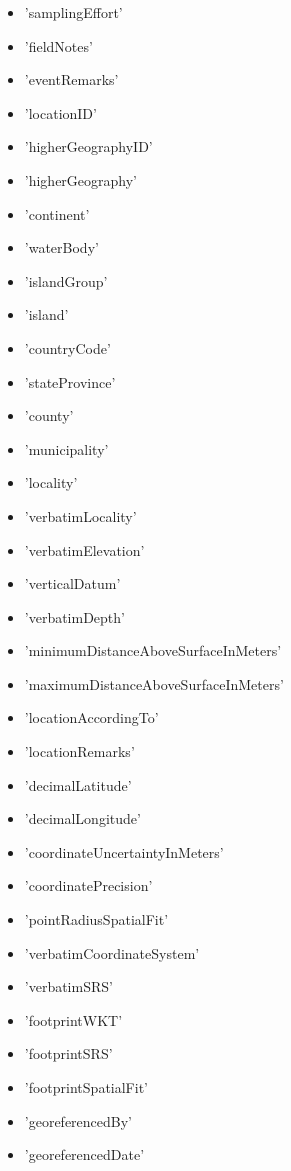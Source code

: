 \documentclass[a4paper]{book}
\begin{document}
\begin{Details}
\begin{itemize}
\item{} 'samplingEffort'
\item{} 'fieldNotes' 
\item{} 'eventRemarks' 
\item{} 'locationID'   
\item{} 'higherGeographyID'
\item{} 'higherGeography' 
\item{} 'continent'
\item{} 'waterBody'
\item{} 'islandGroup' 
\item{} 'island' 
\item{} 'countryCode' 
\item{} 'stateProvince' 
\item{} 'county' 
\item{} 'municipality' 
\item{} 'locality' 
\item{} 'verbatimLocality' 
\item{} 'verbatimElevation'
\item{} 'verticalDatum'
\item{} 'verbatimDepth'
\item{} 'minimumDistanceAboveSurfaceInMeters'
\item{} 'maximumDistanceAboveSurfaceInMeters'
\item{} 'locationAccordingTo'
\item{} 'locationRemarks' 
\item{} 'decimalLatitude' 
\item{} 'decimalLongitude' 
\item{} 'coordinateUncertaintyInMeters'
\item{} 'coordinatePrecision'
\item{} 'pointRadiusSpatialFit'
\item{} 'verbatimCoordinateSystem' 
\item{} 'verbatimSRS'
\item{} 'footprintWKT'
\item{} 'footprintSRS'
\item{} 'footprintSpatialFit'
\item{} 'georeferencedBy'
\item{} 'georeferencedDate'

\end{itemize}
\end{Details}
\end{document}
